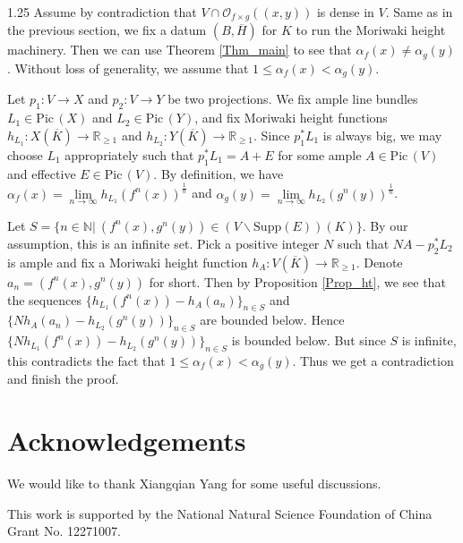 \documentclass[12pt]{amsart}
\newcommand{\mb}[1]{\mathbb{#1}}
\newcommand\ra{\rightarrow}
\newcommand\Pic{\mathrm{Pic\,}}
\begin{document}
\begin{spacing}{1.25}
Assume by contradiction that $V\cap\mathcal{O}_{f\times g}((x,y))$ is dense in $V$. Same as in the previous section, we fix a datum $(B,\overline{H})$ for $K$ to run the Moriwaki height machinery. Then we can use Theorem \ref{Thm_main} to see that $\alpha_f(x)\neq\alpha_g(y)$. Without loss of generality, we assume that $1\leq\alpha_f(x)<\alpha_g(y)$. 

Let $p_1:V\ra X$ and $p_2:V\ra Y$ be two projections. We fix ample line bundles $L_1\in\Pic(X)$ and $L_2\in\Pic(Y)$, and fix Moriwaki height functions $h_{L_1}:X(\overline{K})\ra\mb{R}_{\geq1}$ and $h_{L_2}:Y(\overline{K})\ra\mb{R}_{\geq1}$. Since $p_1^*L_1$ is always big, we may choose $L_1$ appropriately such that $p_1^*L_1=A+E$ for some ample $A\in\Pic(V)$ and effective $E\in\Pic(V)$. By definition, we have $\alpha_f(x)=\lim\limits_{n\ra\infty}h_{L_1}(f^n(x))^{\frac{1}{n}}$ and $\alpha_g(y)=\lim\limits_{n\ra\infty}h_{L_2}(g^n(y))^{\frac{1}{n}}$.

Let $S=\{n\in\mathbb{N}|\ (f^n(x),g^n(y))\in(V\backslash\mathrm{Supp}(E))(K)\}$. By our assumption, this is an infinite set. Pick a positive integer $N$ such that $NA-p_2^*L_2$ is ample and fix a Moriwaki height function $h_A:V(\overline{K})\ra\mb{R}_{\geq1}$. Denote $a_n=(f^n(x),g^n(y))$ for short. Then by Proposition \ref{Prop_ht}, we see that the sequences $\{h_{L_1}(f^n(x))-h_A(a_n)\}_{n\in S}$ and $\{Nh_A(a_n)-h_{L_2}(g^n(y))\}_{n\in S}$ are bounded below. Hence $\{Nh_{L_1}(f^n(x))-h_{L_2}(g^n(y))\}_{n\in S}$ is bounded below. But since $S$ is infinite, this contradicts the fact that $1\leq\alpha_f(x)<\alpha_g(y)$. Thus we get a contradiction and finish the proof.
\endproof










\section*{Acknowledgements}
We would like to thank Xiangqian Yang for some useful discussions.

This work is supported by the National Natural Science Foundation of China Grant No. 12271007.






\end{spacing}
\end{document}
